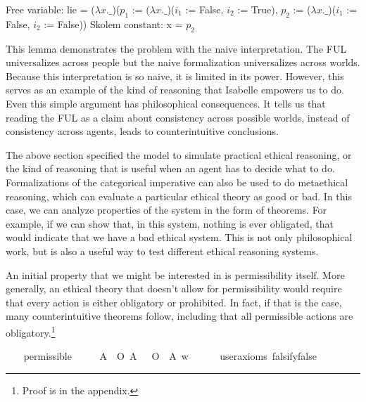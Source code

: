 \begin{isabellebody}
{  Free variable:
    lie = ($\lambda x. \_$)($p_1$ := ($\lambda x. \_$)($i_1$ := False, $i_2$ := True), $p_2$ := ($\lambda x. \_$)($i_1$ := False, $i_2$ := False))
  Skolem constant:
    x = $p_2$ \color{black}%
}%
\endisatagproof
{\isafoldproof}%
%
\isadelimproof
%
\endisadelimproof
%
\begin{isamarkuptext}%
This lemma demonstrates the problem with the naive interpretation. The FUL universalizes across people
but the naive formalization universalizes across worlds. Because this interpretation is so naive, it is 
limited in its power. However, this serves as an example of the kind of reasoning that 
Isabelle empowers us to do. Even this simple argument has philosophical consequences. It tells us that
reading the FUL as a claim about consistency across possible worlds, instead of consistency across 
agents, leads to counterintuitive conclusions.%
\end{isamarkuptext}\isamarkuptrue%
%
\isadelimdocument
%
\endisadelimdocument
%
\isatagdocument
%
\isamarkuptrue%
%
\endisatagdocument
{\isafolddocument}%
%
\isadelimdocument
%
\endisadelimdocument
%
\begin{isamarkuptext}%
The above section specified the model to simulate practical ethical reasoning, or the kind of 
reasoning that is useful when an agent has to decide what to do. Formalizations of the categorical 
imperative can also be used to do metaethical reasoning, which can evaluate a particular ethical theory
as good or bad. In this case, we can analyze properties of the system in the form of theorems. For example,
if we can show that, in this system, nothing is ever obligated, that would indicate that we have a bad 
ethical system. This is not only philosophical work, but is also a useful way to test different ethical
reasoning systems.

An initial property that we might be interested in is permissibility itself. More generally, an ethical
theory that doesn't allow for permissibility would require that every action is either obligatory or 
prohibited. In fact, if that is the case, many counterintuitive theorems follow, including that all 
permissible actions are obligatory.\footnote{Proof is in the appendix.}%
\end{isamarkuptext}\isamarkuptrue%
\ \ \isamarkupfalse%
\ permissible{\isacharcolon}\isanewline
\ \ \ \ \ {\isachardoublequoteopen}{\isasymexists}A{\isachardot}\ {\isacharparenleft}{\isacharparenleft}\isactrlbold {\isasymnot}\ {\isacharparenleft}O\ {\isacharbraceleft}A{\isacharbraceright}{\isacharparenright}{\isacharparenright}\ \isactrlbold {\isasymand}\ {\isacharparenleft}\isactrlbold {\isasymnot}\ {\isacharparenleft}O\ {\isacharbraceleft}\isactrlbold {\isasymnot}\ A{\isacharbraceright}{\isacharparenright}{\isacharparenright}{\isacharparenright}\ w{\isachardoublequoteclose}\isanewline
\ \ \ \ \isamarkupfalse%
\ {\isacharbrackleft}user{\isacharunderscore}axioms{\isacharcomma}\ falsify{\isacharequal}false{\isacharbrackright}%
\isadelimproof
\ %
\endisadelimproof
%
\isatagproof
{}\isamarkupfalse%
\isanewline
%
\end{isabellebody}
